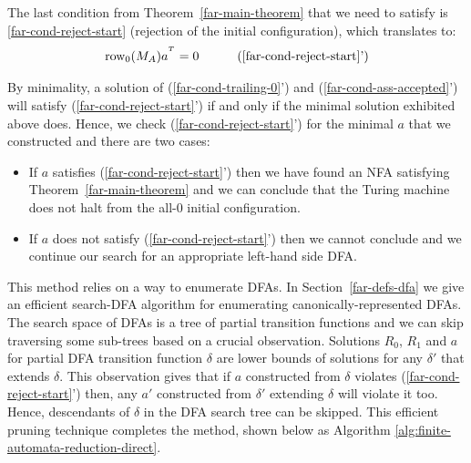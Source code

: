 The last condition from Theorem~\ref{far-main-theorem} that we need to satisfy is \eqref{far-cond-reject-start} (rejection of the initial configuration), which translates to:
\begin{align}
  \row_0 (M_A) a^{\T} & =0
                      & \tag{\ref{far-cond-reject-start}'}
\end{align}

By minimality, a solution of (\ref{far-cond-trailing-0}') and (\ref{far-cond-ass-accepted}') will satisfy (\ref{far-cond-reject-start}') if and only if the minimal solution exhibited above does. Hence, we check (\ref{far-cond-reject-start}') for the minimal $a$ that we constructed and there are two cases:

\begin{itemize}
  \item If $a$ satisfies (\ref{far-cond-reject-start}') then we have found an NFA satisfying Theorem~\ref{far-main-theorem} and we can conclude that the Turing machine does not halt from the all-0 initial configuration.
  \item If $a$ does not satisfy (\ref{far-cond-reject-start}') then we cannot conclude and we continue our search for an appropriate left-hand side DFA.
\end{itemize}

This method relies on a way to enumerate DFAs. In Section~\ref{far-defs-dfa} we give an efficient {\sc search-DFA} algorithm for enumerating canonically-represented DFAs. The search space of DFAs is a tree of partial transition functions and we can skip traversing some sub-trees based on a crucial observation. Solutions $R_0$, $R_1$ and $a$ for partial DFA transition function $\delta$ are lower bounds of solutions for any $\delta'$ that extends $\delta$. This observation gives that if $a$ constructed from $\delta$ violates (\ref{far-cond-reject-start}') then, any $a'$ constructed from $\delta'$ extending $\delta$ will violate it too. Hence, descendants of $\delta$ in the DFA search tree can be skipped.
This efficient pruning technique completes the method, shown below as Algorithm \ref{alg:finite-automata-reduction-direct}.

